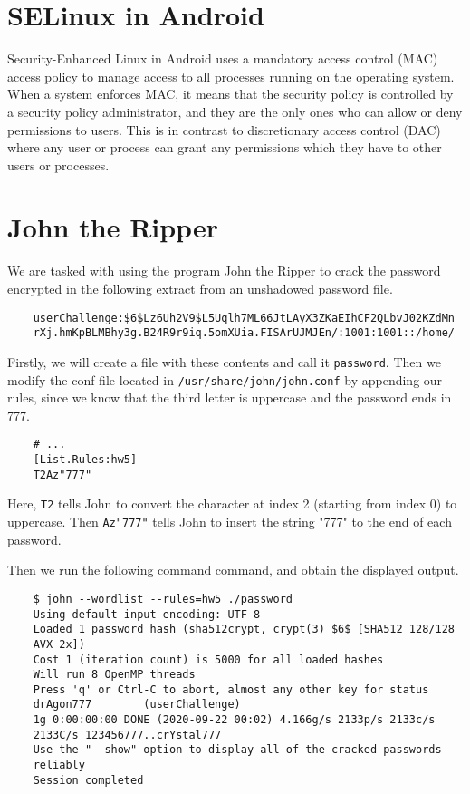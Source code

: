 \documentclass{article}
\begin{document}
\section{SELinux in Android}

Security-Enhanced Linux in Android uses a mandatory access control (MAC) access policy to manage access to all processes running on the operating system. When a system enforces MAC, it means that the security policy is controlled by a security policy administrator, and they are the only ones who can allow or deny permissions to users. This is in contrast to discretionary access control (DAC) where any user or process can grant any permissions which they have to other users or processes.

\section{John the Ripper}

We are tasked with using the program John the Ripper to crack the password encrypted in the following extract from an unshadowed password file.

\begin{verbatim}
	userChallenge:$6$Lz6Uh2V9$L5Uqlh7ML66JtLAyX3ZKaEIhCF2QLbvJ02KZdMn
	rXj.hmKpBLMBhy3g.B24R9r9iq.5omXUia.FISArUJMJEn/:1001:1001::/home/
\end{verbatim}

Firstly, we will create a file with these contents and call it \verb`password`. Then we modify the conf file located in \verb`/usr/share/john/john.conf` by appending our rules, since we know that the third letter is uppercase and the password ends in 777.

\begin{verbatim}
	# ...
	[List.Rules:hw5]
	T2Az"777"
\end{verbatim}

Here, \verb`T2` tells John to convert the character at index 2 (starting from index 0) to uppercase. Then \verb`Az"777"` tells John to insert the string "777" to the end of each password.

Then we run the following command command, and obtain the displayed output.
\begin{verbatim}
	$ john --wordlist --rules=hw5 ./password
	Using default input encoding: UTF-8
	Loaded 1 password hash (sha512crypt, crypt(3) $6$ [SHA512 128/128
	AVX 2x])
	Cost 1 (iteration count) is 5000 for all loaded hashes
	Will run 8 OpenMP threads
	Press 'q' or Ctrl-C to abort, almost any other key for status
	drAgon777        (userChallenge)
	1g 0:00:00:00 DONE (2020-09-22 00:02) 4.166g/s 2133p/s 2133c/s
	2133C/s 123456777..crYstal777
	Use the "--show" option to display all of the cracked passwords
	reliably
	Session completed
\end{verbatim}
\end{document}
